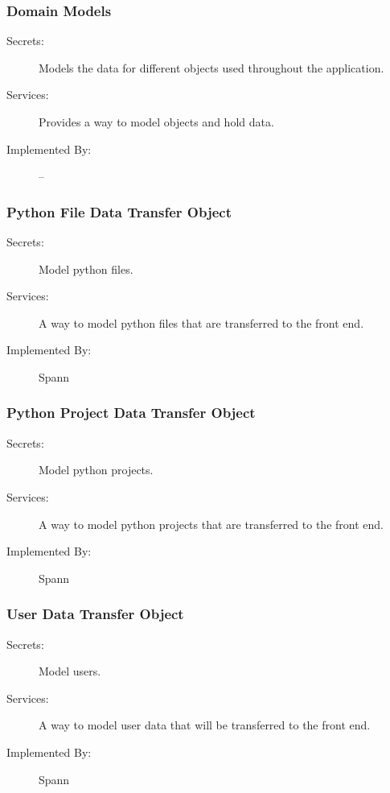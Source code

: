 \documentclass[12pt, titlepage]{article}
\begin{document}
\subsubsection{Domain Models} \label{mdDomainModels} 

\begin{description}
\item[Secrets:] Models the data for different objects used throughout the
    application.
\item[Services:] Provides a way to model objects and hold data.
\item[Implemented By:] --
\end{description}

\subsubsection{Python File Data Transfer Object} \label{mdPythonFileDTO} 

\begin{description}
\item[Secrets:] Model python files.
\item[Services:] A way to model python files that are transferred to the front
    end.
\item[Implemented By:] Spann
\end{description}

\subsubsection{Python Project Data Transfer Object} \label{mdPythonProjectDTO} 

\begin{description}
\item[Secrets:] Model python projects.
\item[Services:] A way to model python projects that are transferred to the front
    end.
\item[Implemented By:] Spann
\end{description}

\subsubsection{User Data Transfer Object} \label{mdUserDTO} 

\begin{description}
\item[Secrets:] Model users.
\item[Services:] A way to model user data that will be transferred to the front
    end.
\item[Implemented By:] Spann
\end{description}
\end{document}

